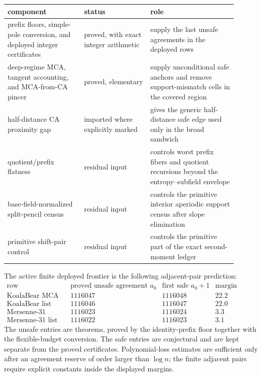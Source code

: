 \documentclass[11pt]{article}
\theoremstyle{definition}
\theoremstyle{remark}
\begin{document}
\begin{center}\small
\begin{tabular}{@{}p{0.30\linewidth}p{0.26\linewidth}p{0.34\linewidth}@{}}
\toprule
component & status & role \\
\midrule
prefix floors, simple-pole conversion, and deployed integer certificates & proved, with exact integer arithmetic & supply the last unsafe agreements in the deployed rows \\

deep-regime MCA, tangent accounting, and MCA-from-CA pincer & proved, elementary & supply unconditional safe anchors and remove support-mismatch cells in the covered region \\

half-distance CA proximity gap & imported where explicitly marked & gives the generic half-distance safe edge used only in the broad sandwich \\

quotient/prefix flatness & residual input & controls worst prefix fibers and quotient recursions beyond the entropy--subfield envelope \\

base-field-normalized split-pencil census & residual input & controls the primitive interior aperiodic support census after slope elimination \\

primitive shift-pair control & residual input & controls the primitive part of the exact second-moment ledger \\
\bottomrule
\end{tabular}
\end{center}

The active finite deployed frontier is the following adjacent-pair prediction:
\[
\begin{array}{c|cc|c}
\text{row} & \text{proved unsafe agreement }a_0 &
\text{first safe }a_0+1 &
\text{margin (bits)}\\ \hline
\text{KoalaBear MCA} & 1116047 & 1116048 & 22.2\\
\text{KoalaBear list} & 1116046 & 1116047 & 22.0\\
\text{Mersenne-31 MCA} & 1116023 & 1116024 & 3.3\\
\text{Mersenne-31 list} & 1116022 & 1116023 & 3.1
\end{array}
\]
The unsafe entries are theorems, proved by the identity-prefix floor together with the flexible-budget conversion.  The safe entries are conjectural and are kept separate from the proved certificates.  Polynomial-loss estimates are sufficient only after an agreement reserve of order larger than \(\log n\); the finite adjacent pairs require explicit constants inside the displayed margins.
\end{document}
